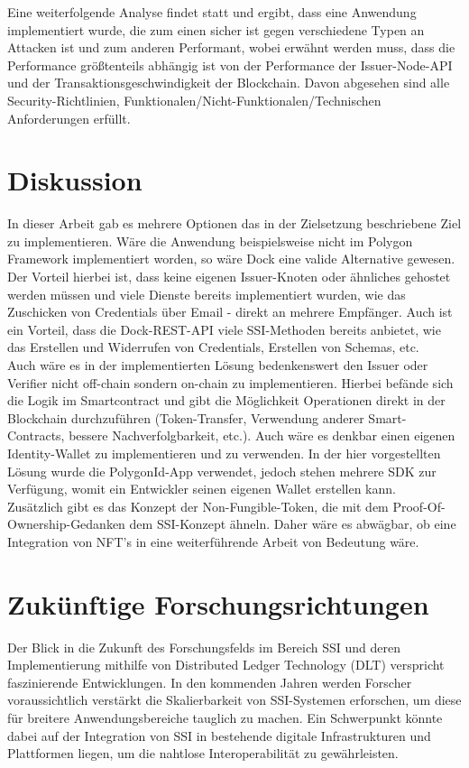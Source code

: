 Eine weiterfolgende Analyse findet statt und ergibt, dass eine Anwendung implementiert wurde, die zum einen sicher ist gegen verschiedene Typen an Attacken ist und zum anderen Performant, wobei erwähnt werden muss, dass die Performance größtenteils abhängig ist von der Performance der Issuer-Node-API und der Transaktionsgeschwindigkeit der Blockchain. Davon abgesehen sind alle Security-Richtlinien, Funktionalen/Nicht-Funktionalen/Technischen Anforderungen erfüllt.


\section{Diskussion}
In dieser Arbeit gab es mehrere Optionen das in der Zielsetzung beschriebene Ziel zu implementieren. Wäre die Anwendung beispielsweise nicht im Polygon Framework implementiert worden, so wäre Dock eine valide Alternative gewesen. Der Vorteil hierbei ist, dass keine eigenen Issuer-Knoten oder ähnliches gehostet werden müssen und viele Dienste bereits implementiert wurden, wie das Zuschicken von Credentials über Email - direkt an mehrere Empfänger. Auch ist ein Vorteil, dass die Dock-REST-API viele SSI-Methoden bereits anbietet, wie das Erstellen und Widerrufen von Credentials, Erstellen von Schemas, etc.\\
Auch wäre es in der implementierten Lösung bedenkenswert den Issuer oder Verifier nicht off-chain sondern on-chain zu implementieren. Hierbei befände sich die Logik im Smartcontract und gibt die Möglichkeit Operationen direkt in der Blockchain durchzuführen (Token-Transfer, Verwendung anderer Smart-Contracts, bessere Nachverfolgbarkeit, etc.). Auch wäre es denkbar einen eigenen Identity-Wallet zu implementieren und zu verwenden. In der hier vorgestellten Lösung wurde die PolygonId-App verwendet, jedoch stehen mehrere SDK zur Verfügung, womit ein Entwickler seinen eigenen Wallet erstellen kann.\\
Zusätzlich gibt es das Konzept der Non-Fungible-Token, die mit dem Proof-Of-Ownership-Gedanken dem SSI-Konzept ähneln. Daher wäre es abwägbar, ob eine Integration von NFT's in eine weiterführende Arbeit von Bedeutung wäre.


\section{Zukünftige Forschungsrichtungen}
Der Blick in die Zukunft des Forschungsfelds im Bereich SSI und deren Implementierung mithilfe von Distributed Ledger Technology (DLT) verspricht faszinierende Entwicklungen. In den kommenden Jahren werden Forscher voraussichtlich verstärkt die Skalierbarkeit von SSI-Systemen erforschen, um diese für breitere Anwendungsbereiche tauglich zu machen. Ein Schwerpunkt könnte dabei auf der Integration von SSI in bestehende digitale Infrastrukturen und Plattformen liegen, um die nahtlose Interoperabilität zu gewährleisten.

